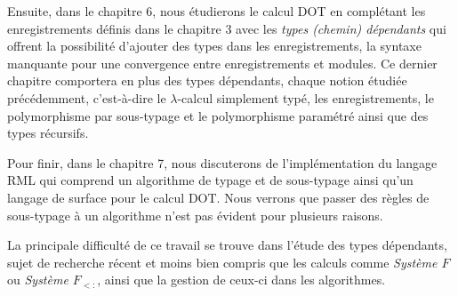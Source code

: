 Ensuite, dans le chapitre 6, nous étudierons le calcul DOT en complétant les
enregistrements définis dans le chapitre 3 avec les \textit{types (chemin)
dépendants} qui offrent la possibilité d'ajouter des types dans les
enregistrements, la syntaxe manquante pour une
convergence entre enregistrements et modules. Ce dernier chapitre comportera en
plus des types dépendants, chaque notion étudiée précédemment,
c'est-à-dire le $\lambda$-calcul simplement typé, les
enregistrements, le polymorphisme par sous-typage et le polymorphisme paramétré
ainsi que des types récursifs.

Pour finir, dans le chapitre 7, nous discuterons de l'implémentation du langage
RML\cite{rml-github} qui comprend un algorithme de typage et de sous-typage
ainsi qu'un langage de surface pour le
calcul DOT. Nous verrons que passer des règles de sous-typage à un algorithme
n'est pas évident pour plusieurs raisons.


La principale difficulté de ce travail se trouve dans l'étude des types
dépendants, sujet de recherche récent et moins bien compris que les
calculs comme \textit{Système $F$} ou \textit{Système $F_{<:}$}, ainsi que
la gestion de ceux-ci dans les algorithmes.
